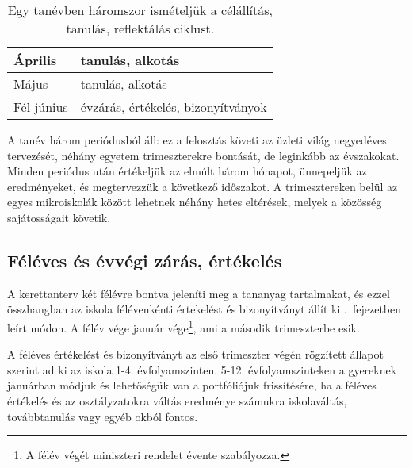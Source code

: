\begin{table}
\begin{tabular}{ l|l }
    Április          &
    tanulás, alkotás
    \\ \hline

    Május            &
    tanulás, alkotás
    \\ \hline

    Fél június       &
    évzárás, értékelés, bizonyítványok
  \end{tabular}
  \caption{Egy tanévben háromszor ismételjük a célállítás, tanulás,
    reflektálás ciklust.}
  \label{tbl:tanevritmus}
\end{table}

A tanév három periódusból áll: ez a felosztás követi az üzleti világ negyedéves
tervezését, néhány egyetem trimeszterekre bontását, de leginkább az évszakokat.
Minden periódus után értékeljük az elmúlt három hónapot, ünnepeljük az
eredményeket, és megtervezzük a következő időszakot.  A trimesztereken belül az
egyes mikroiskolák között lehetnek néhány hetes eltérések, melyek a közösség
sajátosságait követik.

\subsection{Féléves és évvégi zárás, értékelés}
\label{sec:feleves_bontas}
A kerettanterv két félévre bontva jeleníti meg a tananyag tartalmakat, és ezzel összhangban az iskola félévenkénti értekelést és bizonyítványt állít ki .~fejezetben leírt módon. A félév vége január vége\footnote{A félév végét miniszteri rendelet évente szabályozza.}, ami a második trimeszterbe esik. 

A féléves értékelést és bizonyítványt az első trimeszter végén rögzített állapot szerint ad ki az iskola 1-4. évfolyamszinten. 5-12. évfolyamszinteken a gyereknek januárban módjuk és lehetőségük van a portfóliójuk frissítésére, ha a féléves értékelés és az osztályzatokra váltás eredménye számukra iskolaváltás, továbbtanulás vagy egyéb okból fontos. 